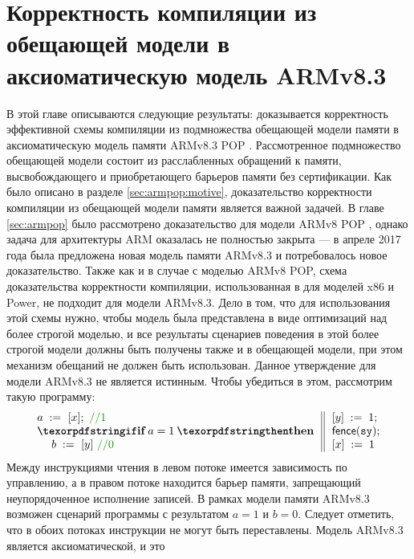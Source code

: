 \chapter{Корректность компиляции из обещающей модели в аксиоматическую модель ARMv8.3} \label{sec:armv83}
В этой главе описываются следующие результаты:
доказывается корректность эффективной схемы компиляции из
подмножества обещающей модели памяти \cite{Kang-al:POPL17} в аксиоматическую
модель памяти ARMv8.3 POP \cite{Pulte-al:POPL18}.
Рассмотренное подмножество обещающей модели состоит из расслабленных обращений к памяти,
высвобождающего и приобретающего барьеров памяти без сертификации.
Как было описано в разделе \ref{sec:armpop:motive}, доказательство корректности
компиляции из обещающей модели памяти является важной задачей. 
В главе \ref{sec:armpop} было рассмотрено доказательство для модели ARMv8 POP \cite{Flur-al:POPL16},
однако задача для архитектуры ARM оказалась не полностью закрыта --- 
в апреле 2017 года была предложена новая модель памяти ARMv8.3 \cite{ARMv82,Pulte-al:POPL18} и потребовалось новое доказательство. 
Также как и в случае с моделью ARMv8 POP, схема доказательства корректности компиляции,
использованная в \cite{Kang-al:POPL17} для моделей x86 и Power, не подходит для модели ARMv8.3.
Дело в том, что для использования этой схемы нужно, чтобы модель была представлена в виде оптимизаций над более строгой
моделью, и все результаты сценариев поведения в этой более строгой модели должны быть получены также и в обещающей модели, при этом 
механизм обещаний не должен быть использован.
Данное утверждение для модели ARMv8.3 не является истинным.
Чтобы убедиться в этом, рассмотрим такую программу:
\[\inarrII{
\readInst{a}{x}; ~\valuecom{1} \\
\itne{a=1}{\readInst{b}{y} ~\valuecom{0}} 
}
{
\writeInst{y}{1}; \\
\fenceInst{\SY}; \\
\writeInst{x}{1}
}\]
Между инструкциями чтения в левом потоке имеется  зависимость по управлению, а в правом потоке находится барьер памяти, запрещающий неупорядоченное  исполнение записей.
В рамках модели памяти ARMv8.3 возможен сценарий программы с результатом $a = 1$ и $b = 0$. Следует отметить, 
что в обоих потоках инструкции не могут быть переставлены. 
Модель ARMv8.3 является аксиоматической, и это
